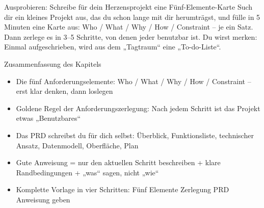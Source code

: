 \begin{tcbpractice}{Ausprobieren: Schreibe für dein Herzensprojekt eine Fünf-Elemente-Karte}
Such dir ein kleines Projekt aus, das du schon lange mit dir herumträgst, und fülle in 5 Minuten eine Karte aus: Who / What / Why / How / Constraint – je ein Satz. Dann zerlege es in 3–5 Schritte, von denen jeder benutzbar ist. Du wirst merken: Einmal aufgeschrieben, wird aus dem „Tagtraum“ eine „To-do-Liste“.

\end{tcbpractice}

\begin{tcbsummary}{Zusammenfassung des Kapitels}
\begin{itemize}
  \item Die fünf Anforderungselemente: Who / What / Why / How / Constraint – erst klar denken, dann loslegen
  \item Goldene Regel der Anforderungszerlegung: Nach jedem Schritt ist das Projekt etwas „Benutzbares“
  \item Das PRD schreibst du für dich selbst: Überblick, Funktionsliste, technischer Ansatz, Datenmodell, Oberfläche, Plan
  \item Gute Anweisung = nur den aktuellen Schritt beschreiben + klare Randbedingungen + „was“ sagen, nicht „wie“
  \item Komplette Vorlage in vier Schritten: Fünf Elemente Zerlegung PRD Anweisung geben
\end{itemize}

\end{tcbsummary}
